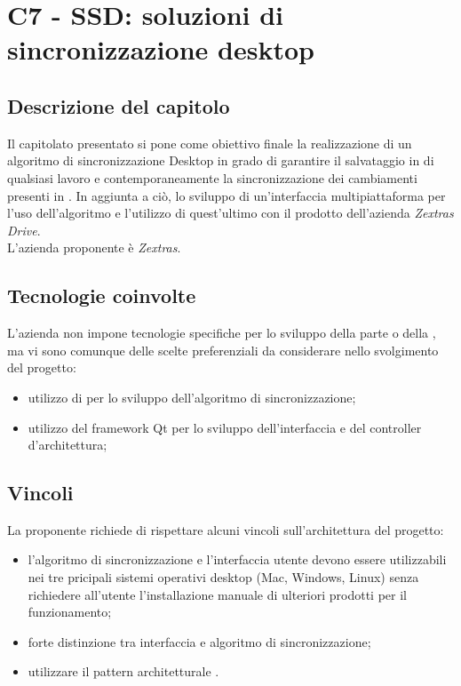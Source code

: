 \section{C7 - SSD: soluzioni di sincronizzazione desktop}

\subsection{Descrizione del capitolo}
Il capitolato presentato si pone come obiettivo finale la realizzazione di un algoritmo di sincronizzazione Desktop in grado di garantire il salvataggio in  di qualsiasi lavoro e contemporaneamente la sincronizzazione dei cambiamenti presenti in . In aggiunta a ciò, lo sviluppo di un'interfaccia multipiattaforma per l'uso dell'algoritmo e l'utilizzo di quest'ultimo con il prodotto dell'azienda \textit{Zextras Drive}.\\
L'azienda proponente è \textit{Zextras}.

\subsection{Tecnologie coinvolte}
L'azienda non impone tecnologie specifiche per lo sviluppo della parte  o della , ma vi sono comunque delle scelte preferenziali da considerare nello svolgimento del progetto:
\begin{itemize}
\item utilizzo di  per lo sviluppo dell'algoritmo di sincronizzazione;
\item utilizzo del framework Qt per lo sviluppo dell'interfaccia e del controller d'architettura;
\end{itemize}

\subsection{Vincoli}
La proponente richiede di rispettare alcuni vincoli sull'architettura del progetto: 
\begin{itemize}
\item l’algoritmo di sincronizzazione e l’interfaccia utente devono essere utilizzabili nei tre pricipali sistemi operativi desktop (Mac, Windows, Linux) senza richiedere all’utente l’installazione manuale di ulteriori prodotti per il funzionamento; 
\item forte distinzione tra interfaccia e algoritmo di sincronizzazione; 
\item utilizzare il pattern architetturale .
\end{itemize}

